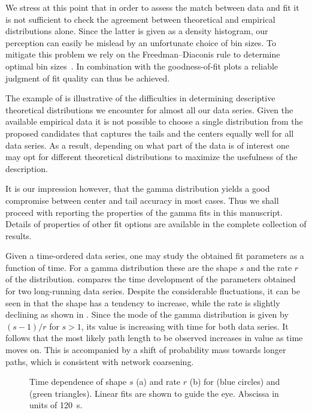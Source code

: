 		We stress at this point that in order to assess the match between data and fit it is not sufficient to check the agreement between theoretical and empirical distributions alone. Since the latter is given as a density histogram, our perception can easily be mislead by an unfortunate choice of bin sizes. To mitigate this problem we rely on the Freedman–Diaconis rule to determine optimal bin sizes~\cite{freedman1981histogram}. In combination with the goodness-of-fit plots a reliable judgment of fit quality can thus be achieved. 

		The example of  is illustrative of the difficulties in determining descriptive theoretical distributions we encounter for almost all our data series. Given the available empirical data it is not possible to choose a single distribution from the proposed candidates that captures the tails and the centers equally well for all data series. As a result, depending on what part of the data is of interest one may opt for different theoretical distributions to maximize the usefulness of the description.

		It is our impression however, that the gamma distribution yields a good compromise between center and tail accuracy in most cases. Thus we shall proceed with reporting the properties of the gamma fits in this manuscript. Details of properties of other fit options are available in the complete collection of results. 

		Given a time-ordered data series, one may study the obtained fit parameters as a function of time. For a gamma distribution these are the shape $s$ and the rate $r$ of the distribution.  compares the time development of the parameters obtained for two long-running data series. Despite the considerable fluctuations, it can be seen in  that the shape has a tendency to increase, while the rate is slightly declining as shown in . Since the mode of the gamma distribution is given by $(s-1)/r$ for $s > 1$, its value is increasing with time for both data series. It follows that the most likely path length to be observed increases in value as time moves on. This is accompanied by a shift of probability mass towards longer paths, which is consistent with network coarsening. 

		\begin{figure}
			\centering
			\qquad

			\caption[Path length distribution - Fit parameters]{Time dependence of shape $s$ (a) and rate $r$ (b) for  (blue circles) and  (green triangles). Linear fits are shown to guide the eye. Abscissa in units of \SI{120}{\second}.}
			\label{fig:path_lengths_fit_parameters}
		\end{figure}

